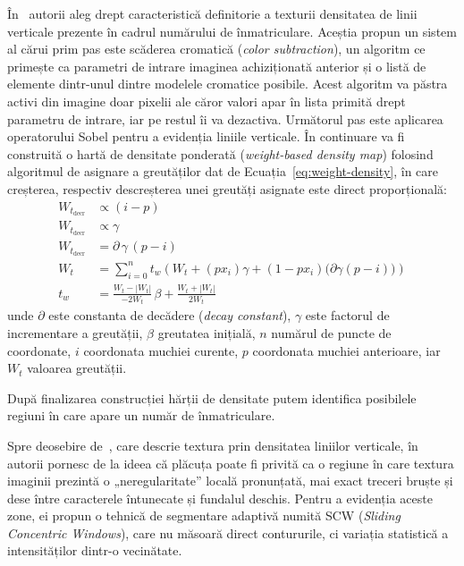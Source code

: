 În~\cite{bremananth2005robust} autorii aleg drept caracteristică definitorie a texturii densitatea de linii verticale prezente în cadrul numărului de înmatriculare. Aceștia propun un sistem al cărui prim pas este scăderea cromatică (\textit{color subtraction}), un algoritm ce primește ca parametri de intrare imaginea achiziționată anterior și o listă de elemente dintr-unul dintre modelele cromatice posibile. Acest algoritm va păstra activi din imagine doar pixelii ale căror valori apar în lista primită drept parametru de intrare, iar pe restul îi va dezactiva. Următorul pas este aplicarea operatorului Sobel pentru a evidenția liniile verticale. În continuare va fi construită o hartă de densitate ponderată (\textit{weight-based density map}) folosind algoritmul de asignare a greutăților dat de Ecuația~\ref{eq:weight-density}, în care creșterea, respectiv descreșterea unei greutăți asignate este direct proporțională:
\begin{equation}
  \begin{aligned}
    W_{t_{\text{decr}}} &\propto (i - p) \\
    W_{t_{\text{decr}}} &\propto \gamma \\
    W_{t_{\text{decr}}} &= \partial\,\gamma\,(p - i) \\
    W_t &= \sum_{i=0}^{n} t_w \left( W_t + (px_i)\gamma + (1 - px_i)\big(\partial\gamma(p - i)\big) \right) \\
    t_w &= \frac{W_t - |W_t|}{-2W_t}\,\beta + \frac{W_t + |W_t|}{2W_t}
  \end{aligned}
  \label{eq:weight-density}
\end{equation}
unde $\partial$ este constanta de decădere (\textit{decay constant}), $\gamma$ este factorul de incrementare a greutății, $\beta$ greutatea inițială, $n$ numărul de puncte de coordonate, $i$ coordonata muchiei curente, $p$ coordonata muchiei anterioare, iar $W_t$ valoarea greutății.

După finalizarea construcției hărții de densitate putem identifica posibilele regiuni în care apare un număr de înmatriculare.

Spre deosebire de~\cite{bremananth2005robust}, care descrie textura prin densitatea liniilor verticale, în~\cite{anagnostopoulos2006license} autorii pornesc de la ideea că plăcuța poate fi privită ca o regiune în care textura imaginii prezintă o „neregularitate'' locală pronunțată, mai exact treceri bruște și dese între caracterele întunecate și fundalul deschis. Pentru a evidenția aceste zone, ei propun o tehnică de segmentare adaptivă numită SCW (\textit{Sliding Concentric Windows}), care nu măsoară direct contururile, ci variația statistică a intensităților dintr-o vecinătate.

